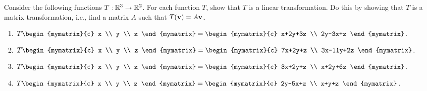\begin{ex}
  Consider the following functions $T:\mathbb{R}^{3}\rightarrow \mathbb{R}^{2}$. For
  each function $T$, show that $T$ is a linear transformation. Do this
  by showing that $T$ is a matrix transformation, i.e., find a matrix
  $A$ such that $T(\vect{v})=A\vect{v}$.
  \begin{enumerate}
  \item $T\begin{mymatrix}{c} x \\ y \\ z \end{mymatrix}
    = \begin{mymatrix}{c}
      x+2y+3z \\
      2y-3x+z
    \end{mymatrix}$.
  \item $T\begin{mymatrix}{c} x \\ y \\ z \end{mymatrix}
    = \begin{mymatrix}{c}
      7x+2y+z \\
      3x-11y+2z
    \end{mymatrix}$.
  \item $T\begin{mymatrix}{c} x \\ y \\ z \end{mymatrix}
    = \begin{mymatrix}{c}
      3x+2y+z \\
      x+2y+6z
    \end{mymatrix}$.
  \item $T\begin{mymatrix}{c} x \\ y \\ z \end{mymatrix}
    = \begin{mymatrix}{c}
      2y-5x+z \\
      x+y+z
    \end{mymatrix}$.
  \end{enumerate}
\end{ex}

